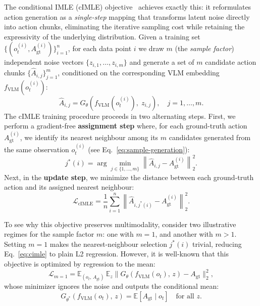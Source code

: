 \documentclass[letterpaper, 10 pt, conference]{ieeeconf}  %
\begin{document}
The conditional IMLE (cIMLE) objective~\cite{imle} achieves exactly this: it reformulates action generation as a \emph{single-step} mapping that transforms latent noise directly into action chunks, eliminating the iterative sampling cost while retaining the expressivity of the underlying distribution. Given a training set $\{(o_t^{(i)}, A_{\mathrm{gt}}^{(i)})\}_{i=1}^{n}$, for each data point $i$ we draw $m$ (the \emph{sample factor}) independent noise vectors $\{z_{i,1},\dots,z_{i,m}\}$ and generate a set of $m$ candidate action chunks $\{\hat{A}_{i,j}\}_{j=1}^{m}$, conditioned on the corresponding VLM embedding $f_{\mathrm{VLM}}(o_t^{(i)})$:
\begin{equation}
\label{eq:sample-generation}
\hat{A}_{i,j} = G_{\theta}\!\left(f_{\mathrm{VLM}}(o_t^{(i)}),\; z_{i,j}\right), \quad j = 1,\dots,m.
\end{equation}
The cIMLE training procedure proceeds in two alternating steps. First, we perform a gradient-free \textbf{assignment step} where, for each ground-truth action $A_{\mathrm{gt}}^{(i)}$, we identify its nearest neighbour among its $m$ candidates generated from the same observation $o_t^{(i)}$ (see Eq.~\ref{eq:sample-generation}):
\begin{equation}\label{eq:assignment}
j^{*}(i) = \arg\min_{j \in \{1,\dots,m\}} \left\lVert \hat{A}_{i,j} - A_{\mathrm{gt}}^{(i)} \right\rVert_2^2.
\end{equation}
Next, in the \textbf{update step}, we minimize the distance between each ground-truth action and its assigned nearest neighbour:
\begin{equation}\label{eq:cimle}
\mathcal{L}_{\mathrm{cIMLE}}
= \frac{1}{n}\sum_{i=1}^{n}
  \left\lVert \hat{A}_{i,j^{*}(i)} - A_{\mathrm{gt}}^{(i)} \right\rVert_2^2.
\end{equation}

To see why this objective preserves multimodality, consider two illustrative regimes for the sample factor $m$: one with $m{=}1$, and another with $m>1$. Setting $m=1$ makes the nearest-neighbour selection $j^*(i)$ trivial, reducing Eq.~\ref{eq:cimle} to plain L2 regression. However, it is well-known that this objective is optimized by regression to the mean:
\begin{equation}\label{eq:regression-mean}
\mathcal{L}_{m=1}
= \mathbb{E}_{(o_t,\, A_{\mathrm{gt}})}\,
  \mathbb{E}_{z}
  \bigl\lVert G_{\theta}(f_{\mathrm{VLM}}(o_t),\, z) - A_{\mathrm{gt}} \bigr\rVert_2^2,
\end{equation}
whose minimizer ignores the noise and outputs the conditional mean:
\begin{equation}\label{eq:conditional-mean}
G_{\theta^{*}}(f_{\mathrm{VLM}}(o_t),\, z)
= \mathbb{E}\!\left[A_{\mathrm{gt}} \mid o_t\right]
\quad \text{for all } z.
\end{equation}
\end{document}

